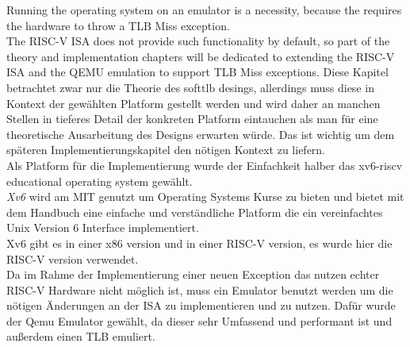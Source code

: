 Running the operating system on an emulator is a necessity, because the requires the hardware to
throw a TLB Miss exception.\\ The RISC-V ISA does not provide such functionality by default, so
part of the theory and implementation chapters will be dedicated to extending the RISC-V ISA and
the QEMU emulation to support TLB Miss exceptions.
Diese Kapitel betrachtet zwar nur die Theorie des softtlb desings, allerdings muss diese in Kontext
der gewählten Platform gestellt werden und wird daher an manchen Stellen in tieferes Detail der konkreten
Platform eintauchen als man für eine theoretische Ausarbeitung des Designs erwarten würde.
Das ist wichtig um dem späteren Implementierungskapitel den nötigen Kontext zu liefern.\\
Als Platform für die Implementierung wurde der Einfachkeit halber das xv6-riscv educational operating
system \cite{cox2011xv6} gewählt.\\
\textit{Xv6} wird am MIT genutzt um Operating Systems Kurse zu bieten und bietet mit dem Handbuch eine
einfache und verständliche Platform die ein vereinfachtes Unix Version 6 Interface implementiert.\\
Xv6 gibt es in einer x86 version und in einer RISC-V version, es wurde hier die RISC-V version verwendet.
\\
Da im Rahme der Implementierung einer neuen Exception das nutzen echter RISC-V Hardware nicht möglich
ist, muss ein Emulator benutzt werden um die nötigen Änderungen an der ISA zu implementieren und zu nutzen.
Dafür wurde der Qemu Emulator gewählt, da dieser sehr Umfassend und performant ist und außerdem einen
TLB emuliert.



